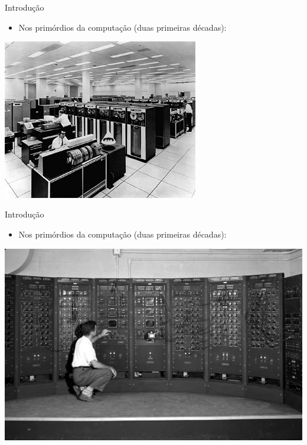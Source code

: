 \documentclass{libs/ufc_format}
\begin{document}
\begin{frame}{Introdução}
    \begin{itemize}
        \justifying
        \item Nos primórdios da computação (duas primeiras décadas):
    \end{itemize}
    \includegraphics[height=7cm, width=\textwidth]{media/mainframe2}
\end{frame}

\begin{frame}{Introdução}
    \begin{itemize}
        \justifying
        \item Nos primórdios da computação (duas primeiras décadas):
    \end{itemize}
    \includegraphics[width=\textwidth]{media/mainframe3}
\end{frame}
\end{document}
